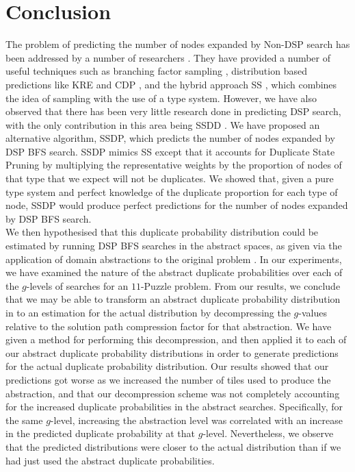 \documentclass{article}
\begin{document}
\section{Conclusion}

The problem of predicting the number of nodes expanded by Non-DSP search has been addressed by a number of
researchers \cite{knuth1975estimating, purdom1978tree, chen1992heuristic, korf2001time, zahavi2010predicting, lelis2013predicting}.
They have provided a number of useful techniques such as branching factor sampling \cite{knuth1975estimating, purdom1978tree},
distribution based predictions like KRE and CDP \cite{korf2001time, zahavi2010predicting, lelis2013predicting},
and the hybrid approach SS \cite{chen1992heuristic}, which combines the idea of sampling with the use of a type system.
However, we have also observed that there has been very little research done in predicting DSP search,
with the only contribution in this area being SSDD \cite{lelis2014estimating}. We have proposed
an alternative algorithm, SSDP, which predicts the number of nodes expanded by DSP BFS search.
SSDP mimics SS except that it accounts for Duplicate State Pruning by multiplying the
representative weights by the proportion of nodes of that type that we expect will not be duplicates.
We showed that, given a pure type system and perfect knowledge of the duplicate proportion for each type of node,
SSDP would produce perfect predictions for the number of nodes expanded by DSP BFS search. \\

We then hypothesised that this duplicate probability distribution could be estimated by running
DSP BFS searches in the abstract spaces, as given via the application of domain abstractions to the original problem \cite{helmert2007flexible}.
In our experiments, we have examined the nature of the abstract duplicate probabilities over each of the \(g\)-levels of searches
for an \(11\)-Puzzle problem.
From our results, we conclude that we may be able to transform an abstract duplicate probability distribution in to an
estimation for the actual distribution by decompressing the \(g\)-values relative to the solution path compression factor
for that abstraction.
We have given a method for performing this decompression, and then applied it to each of our abstract duplicate probability
distributions in order to generate predictions for the actual duplicate probability distribution.
Our results showed that our predictions got worse as we increased the number of tiles used to produce the abstraction,
and that our decompression scheme was not completely accounting for the increased duplicate probabilities in the abstract searches.
Specifically, for the same \(g\)-level, increasing the abstraction level was correlated with an increase in the predicted duplicate probability
at that \(g\)-level.
Nevertheless, we observe that the predicted distributions were closer to the actual distribution
than if we had just used the abstract duplicate probabilities. \\
\end{document}
